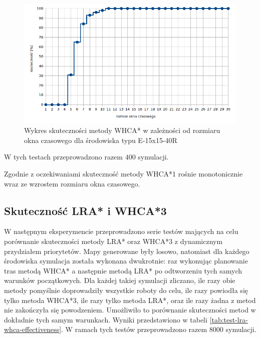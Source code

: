 \begin{figure}
	\centering
	\includegraphics[width=0.8\columnwidth]{img/plots/test-whca-window-E-15x15-40R}
	\caption{Wykres skuteczności metody WHCA* w zależności od rozmiaru okna czasowego dla środowiska typu E-15x15-40R}
	\label{fig:test-whca-window-E-15x15-40R}
\end{figure}

W tych testach przeprowadzono razem $400$ symulacji.

Zgodnie z oczekiwaniami skuteczność metody WHCA*1 rośnie monotonicznie wraz ze wzrostem rozmiaru okna czasowego.

\subsection{Skuteczność LRA* i WHCA*3} %
W następnym eksperymencie przeprowadzono serie testów mających na celu porównanie skuteczności metody LRA* oraz WHCA*3 z dynamicznym przydziałem priorytetów.
Mapy generowane były losowo, natomiast dla każdego środowiska symulacja została wykonana dwukrotnie: raz wykonując planowanie tras metodą WHCA* a następnie metodą LRA* po odtworzeniu tych samych warunków początkowych. Dla każdej takiej symulacji zliczano, ile razy obie metody pomyślnie doprowadziły wszystkie roboty do celu, ile razy powiodła się tylko metoda WHCA*3, ile razy tylko metoda LRA*, oraz ile razy żadna z metod nie zakończyła się powodzeniem.
Umożliwiło to porównanie skuteczności metod w dokładnie tych samym warunkach. Wyniki przedstawiono w tabeli \ref{tab:test-lra-whca-effectiveness}.
W ramach tych testów przeprowadzono razem $8000$ symulacji.

